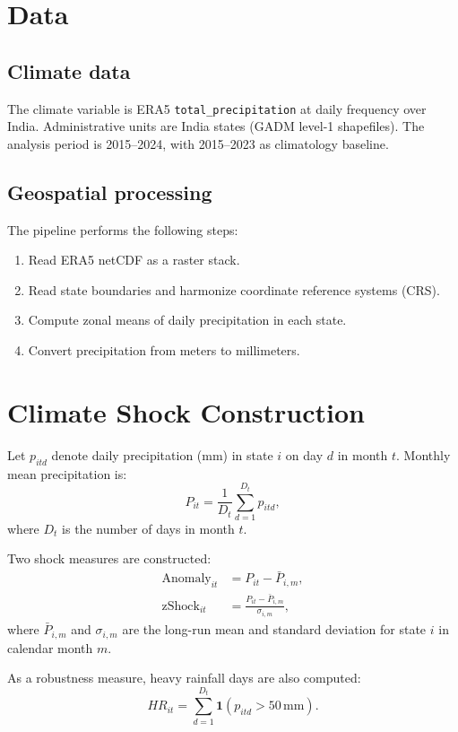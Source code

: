 \documentclass[11pt]{article}
\begin{document}
\section{Data}
\subsection{Climate data}
The climate variable is ERA5 \texttt{total\_precipitation} at daily frequency over India.
Administrative units are India states (GADM level-1 shapefiles). The analysis period is
2015--2024, with 2015--2023 as climatology baseline.

\subsection{Geospatial processing}
The pipeline performs the following steps:
\begin{enumerate}
    \item Read ERA5 netCDF as a raster stack.
    \item Read state boundaries and harmonize coordinate reference systems (CRS).
    \item Compute zonal means of daily precipitation in each state.
    \item Convert precipitation from meters to millimeters.
\end{enumerate}

\section{Climate Shock Construction}
Let $p_{itd}$ denote daily precipitation (mm) in state $i$ on day $d$ in month $t$.
Monthly mean precipitation is:
\begin{equation}
P_{it} = \frac{1}{D_t}\sum_{d=1}^{D_t} p_{itd},
\end{equation}
where $D_t$ is the number of days in month $t$.

Two shock measures are constructed:
\begin{align}
\text{Anomaly}_{it} &= P_{it} - \bar{P}_{i,m}, \\
\text{zShock}_{it} &= \frac{P_{it} - \bar{P}_{i,m}}{\sigma_{i,m}},
\end{align}
where $\bar{P}_{i,m}$ and $\sigma_{i,m}$ are the long-run mean and standard deviation for
state $i$ in calendar month $m$.

As a robustness measure, heavy rainfall days are also computed:
\begin{equation}
HR_{it} = \sum_{d=1}^{D_t} \mathbf{1}(p_{itd} > 50\,\text{mm}).
\end{equation}
\end{document}
